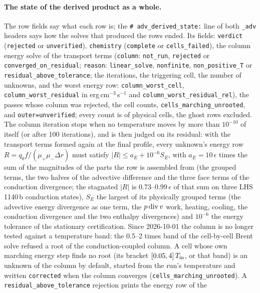 \documentclass[english,a4paper]{my_memo}
\begin{document}
\paragraph{The state of the derived product as a whole.} The row fields say
what each row is; the \texttt{\# adv\_derived\_state:} line of both
\texttt{\_adv} headers says how the solves that produced the rows ended. Its
fields: \texttt{verdict} (\texttt{rejected} or \texttt{unverified}),
\texttt{chemistry} (\texttt{complete} or \texttt{cells\_failed}), the column
energy solve of the transport terms (\texttt{column}: \texttt{not\_run},
\texttt{rejected} or \texttt{converged\_on\_residual}; \texttt{reason}:
\texttt{linear\_solve}, \texttt{nonfinite}, \texttt{non\_positive\_T} or
\texttt{residual\_above\_tolerance}; the iterations, the triggering cell, the
number of unknowns, and the worst energy row: \texttt{column\_worst\_cell},
\texttt{column\_worst\_residual} in erg\,cm$^{-3}$\,s$^{-1}$ and
\texttt{column\_worst\_residual\_rel}), the passes whose column was
rejected, the cell counts, \texttt{cells\_marching\_unrooted}, and
\texttt{outer=unverified}; every count is of physical cells, the ghost rows
excluded. The column iteration stops when no
temperature moves by more than $10^{-10}$ of itself (or after 100
iterations), and is then judged on its residual: with the transport terms
formed again at the final profile, every unknown's energy row
$R = q_0 f/(\mu_+\mu_-\Delta r)$ must satisfy $|R| \le a_E + 10^{-6} S_E$,
with $a_E = 10\,\epsilon$ times the sum of the magnitudes of the parts the
row is assembled from (the grouped terms, the two halves of the advective
difference and the three face terms of the conduction divergence; the
stagnated $|R|$ is 0.73--0.99\,$\epsilon$ of that sum on three LHS\,1140\,b
conduction states), $S_E$ the largest of its physically
grouped terms (the advective energy divergence as one term, the $p\,{\rm
div}\,v$ work, heating, cooling, the conduction divergence and the two
enthalpy divergences) and $10^{-6}$ the energy tolerance of the stationary
certification. Since 2026-10-01 the column is no longer tested against a
temperature band: the 0.5--2 times band of the cell-by-cell Brent solve
refused a root of the conduction-coupled column. A cell whose own marching
energy step finds no root (its bracket $[0.05, 4]\,T_{\rm in}$, or that
band) is an unknown of the column by default, started from the run's
temperature and written \texttt{corrected} when the column converges
(\texttt{cells\_marching\_unrooted}). A
\texttt{residual\_above\_tolerance} rejection prints the energy row of the
\end{document}
